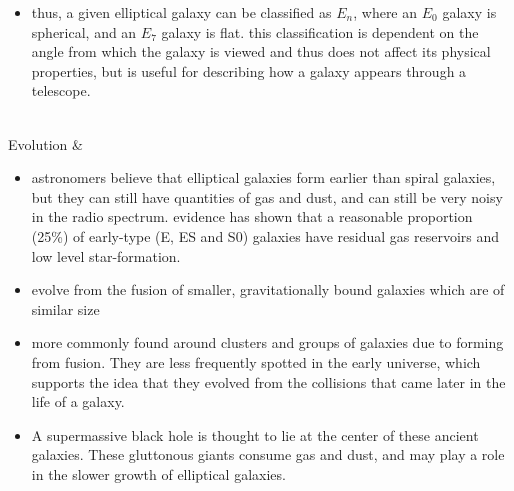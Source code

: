 \begin{longtabu}
\begin{itemize}[noitemsep]
		\item thus, a given elliptical galaxy can be classified as $E_{n}$, where an $E_0$ galaxy is spherical, and an $E_7$ galaxy is flat. this classification is dependent on the angle from which the galaxy is viewed and thus does not affect its physical properties, but is useful for describing how a galaxy appears through a telescope.
	\end{itemize}
	\\
	\hline
	Evolution &
	\begin{itemize}[noitemsep]
		\item astronomers believe that elliptical galaxies form earlier than spiral galaxies, but they can still have quantities of gas and dust, and can still be very noisy in the radio spectrum. evidence has shown that a reasonable proportion (25\%) of early-type (E, ES and S0) galaxies have residual gas reservoirs and low level star-formation.
		\item evolve from the fusion of smaller, gravitationally bound galaxies which are of similar size
		\item more commonly found around clusters and groups of galaxies due to forming from fusion. They are less frequently spotted in the early universe, which supports the idea that they evolved from the collisions that came later in the life of a galaxy.
		\item A supermassive black hole is thought to lie at the center of these ancient galaxies. These gluttonous giants consume gas and dust, and may play a role in the slower growth of elliptical galaxies.
	\end{itemize}
	\\
	\hline
\end{longtabu}

